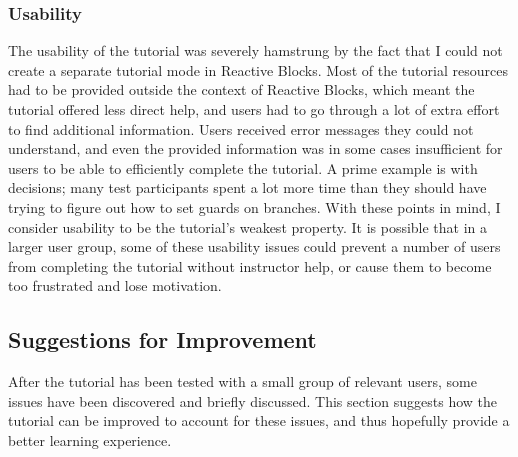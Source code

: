 \subsubsection{Usability}
The usability of the tutorial was severely hamstrung by the fact that I could not create a separate tutorial mode in Reactive Blocks. Most of the tutorial resources had to be provided outside the context of Reactive Blocks, which meant the tutorial offered less direct help, and users had to go through a lot of extra effort to find additional information. Users received error messages they could not understand, and even the provided information was in some cases insufficient for users to be able to efficiently complete the tutorial. A prime example is with decisions; many test participants spent a lot more time than they should have trying to figure out how to set guards on branches. With these points in mind, I consider usability to be the tutorial's weakest property. It is possible that in a larger user group, some of these usability issues could prevent a number of users from completing the tutorial without instructor help, or cause them to become too frustrated and lose motivation.

\subsection{Suggestions for Improvement}
\label{sec:tutorial_improvement}
After the tutorial has been tested with a small group of relevant users, some issues have been discovered and briefly discussed. This section suggests how the tutorial can be improved to account for these issues, and thus hopefully provide a better learning experience. 

